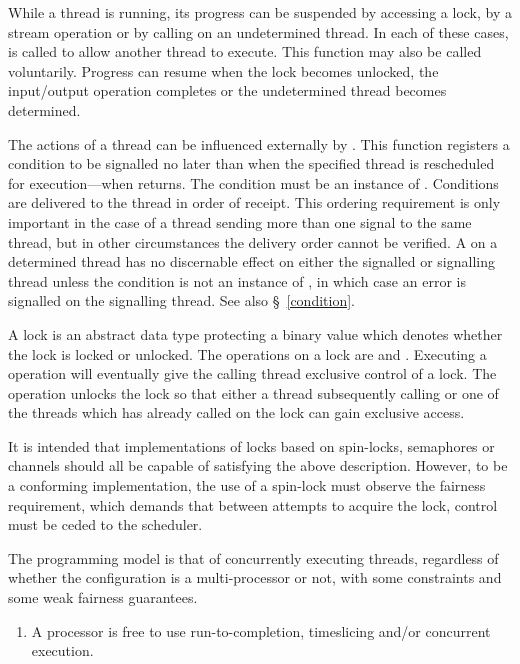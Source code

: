 \begin{optDefinition}
While a thread is running, its progress can be suspended by accessing a lock, by
a stream operation or by calling  on an undetermined
thread.  In each of these cases,  is called to
allow another thread to execute.  This function may also be called voluntarily.
Progress can resume when the lock becomes unlocked, the input/output operation
completes or the undetermined thread becomes determined.

The actions of a thread can be influenced externally by .
This function registers a condition to be signalled no later than when the
specified thread is rescheduled for execution---when
 returns.  The condition must be an instance of
.  Conditions are delivered to the thread in
order of receipt.  This ordering requirement is only important in the case of a
thread sending more than one signal to the same thread, but in other
circumstances the delivery order cannot be verified.  A  on
a determined thread has no discernable effect on either the signalled or
signalling thread unless the condition is not an instance of
, in which case an error is signalled on the
signalling thread.  See also \S~\ref{condition}.

A lock is an abstract data type protecting a binary value which denotes whether
the lock is locked or unlocked.  The operations on a lock are 
and .  Executing a  operation will
eventually give the calling thread exclusive control of a lock.  The
 operation unlocks the lock so that either a thread
subsequently calling  or one of the threads which has already
called  on the lock can gain exclusive access.
%
\begin{note}
    It is intended that implementations of locks based on spin-locks, semaphores
    or channels should all be capable of satisfying the above description.
    However, to be a conforming implementation, the use of a spin-lock must
    observe the fairness requirement, which demands that between attempts to
    acquire the lock, control must be ceded to the scheduler.
\end{note}
%
The programming model is that of concurrently executing threads,
regardless of whether the configuration is a multi-processor or not,
with some constraints and some weak fairness guarantees.
%
\begin{enumerate}
    \item A processor is free to use run-to-completion, timeslicing and/or
    concurrent execution.


\end{enumerate}
\end{optDefinition}
